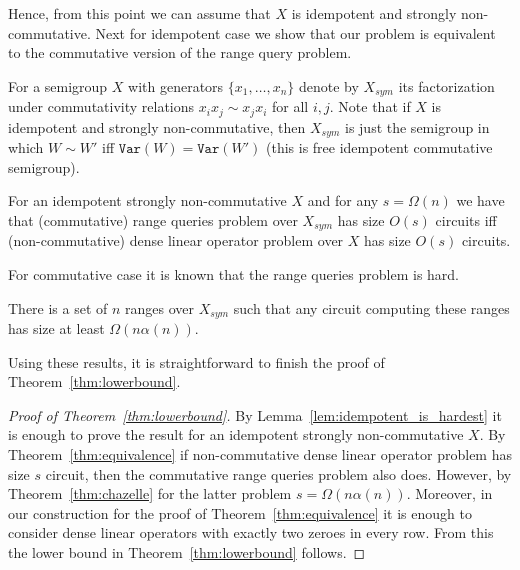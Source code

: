 \documentclass{toc}
\newcommand{\var}{\texttt{Var}}
\begin{document}
Hence, from this point we can assume that $X$ is idempotent and strongly
non-commutative. Next for idempotent case we show that our problem is equivalent
to the commutative version of the range query problem.

For a semigroup $X$ with generators $\{x_1,\ldots, x_n\}$ denote by $X_{sym}$
its factorization under commutativity relations
$x_i x_j \sim x_j x_i$ for all $i,j$. Note that if $X$ is idempotent and
strongly non-commutative, then $X_{sym}$ is just the semigroup in which
$W \sim W'$ iff $\var(W)=\var(W')$ (this is free idempotent commutative
semigroup).

\begin{theorem}\label{thm:equivalence}
For an idempotent strongly non-commutative $X$ and for any $s=\Omega(n)$ we have
that (commutative) range queries problem over $X_{sym}$ has size $O(s)$ circuits
iff (non-commutative) dense linear operator problem over $X$ has size $O(s)$
circuits.
\end{theorem}

For commutative case it is known that the range queries problem is hard.

\begin{theorem}\label{thm:chazelle}
	There is a set of $n$ ranges over $X_{sym}$ such that any circuit
	computing these ranges has size  at least $\Omega(n \alpha(n))$.
\end{theorem}

Using these results, it is straightforward to finish the proof of
Theorem~\ref{thm:lowerbound}.

\begin{proof}[Proof of Theorem~\ref{thm:lowerbound}]


By Lemma~\ref{lem:idempotent_is_hardest} it is enough to prove the result for an idempotent strongly non-commutative $X$.
By Theorem~\ref{thm:equivalence} if non-commutative dense linear
operator problem has size $s$ circuit, then the commutative range queries
problem also does. However, by Theorem~\ref{thm:chazelle} for the latter problem $s=\Omega(n \alpha(n))$.
Moreover, in our construction for the proof of Theorem~\ref{thm:equivalence} it
is enough to consider dense linear operators with exactly two zeroes in every
row. From this the lower bound in Theorem~\ref{thm:lowerbound} follows.
\end{proof}
\end{document}
